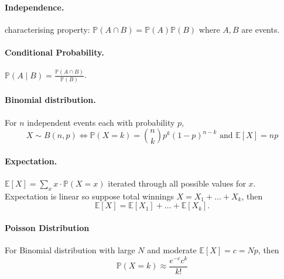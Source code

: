 \documentclass[11pt,twocolumn]{scrartcl}
\begin{document}
\paragraph{Independence.} characterising property: $\mathbb{P}(A\cap B) = \mathbb{P}(A)\mathbb{P}(B)$ where $A,B$ are events.

\paragraph{Conditional Probability.} $\mathbb{P}(A\mid B) = \displaystyle\frac{\mathbb{P}(A\cap B)}{\mathbb{P}(B)}$.

\paragraph{Binomial distribution.}
For $n$ independent events each with probability $p$,
\[
	X\sim B(n,p) \iff \mathbb{P}(X=k) = \binom{n}{k}p^k(1-p)^{n-k}
	\text{ and } \mathbb{E}[X] = np
\]
\paragraph{Expectation.} $\mathbb{E}[X] = \displaystyle\sum_x x\cdot\mathbb{P}(X = x)$ iterated through all possible values for $x$.\\
Expectation is linear so suppose total winnings $X = X_1 + \dots + X_k$, then
$$\mathbb{E}[X] = \mathbb{E}[X_1] + \dots + \mathbb{E}[X_k].$$

\paragraph{Poisson Distribution} For Binomial distribution with large $N$ and moderate $\mathbb{E}[X] = c = Np$, then
$$\mathbb{P}(X = k) \approx \frac{e^{-c}c^k}{k!}$$

\end{document}
